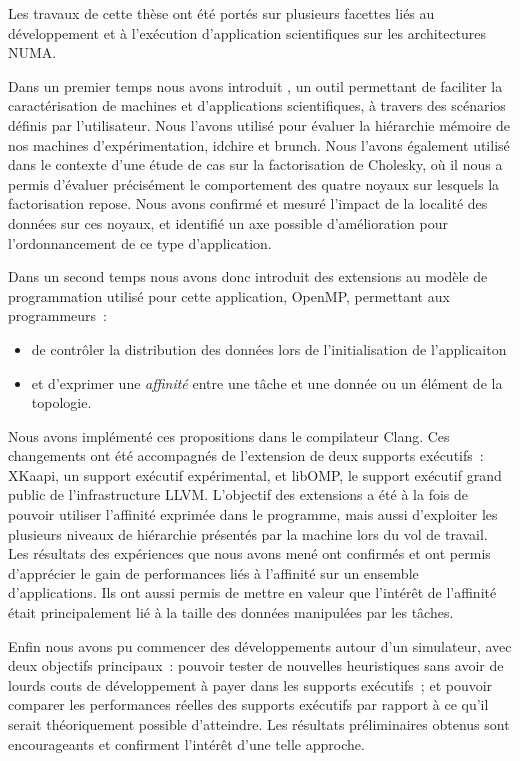 Les travaux de cette thèse ont été portés sur plusieurs facettes liés au développement et à l'exécution d'application scientifiques sur les architectures NUMA.

Dans un premier temps nous avons introduit \outil, un outil permettant de faciliter la caractérisation de machines et d'applications scientifiques, à travers des scénarios définis par l'utilisateur.
Nous l'avons utilisé pour évaluer la hiérarchie mémoire de nos machines d'expérimentation, idchire et brunch.
Nous l'avons également utilisé dans le contexte d'une étude de cas sur la factorisation de Cholesky, où il nous a permis d'évaluer précisément le comportement des quatre noyaux sur lesquels la factorisation repose.
Nous avons confirmé et mesuré l'impact de la localité des données sur ces noyaux, et identifié un axe possible d'amélioration pour l'ordonnancement de ce type d'application.

Dans un second temps nous avons donc introduit des extensions au modèle de programmation utilisé pour cette application, OpenMP, permettant aux programmeurs~:
\begin{itemize}
  \item de contrôler la distribution des données lors de l'initialisation de l'applicaiton
  \item et d'exprimer une \emph{affinité} entre une tâche et une donnée ou un élément de la topologie.
\end{itemize}

Nous avons implémenté ces propositions dans le compilateur Clang.
Ces changements ont été accompagnés de l'extension de deux supports exécutifs~: XKaapi, un support exécutif expérimental, et libOMP, le support exécutif grand public de l'infrastructure LLVM.
L'objectif des extensions a été à la fois de pouvoir utiliser l'affinité exprimée dans le programme, mais aussi d'exploiter les plusieurs niveaux de hiérarchie présentés par la machine lors du vol de travail.
Les résultats des expériences que nous avons mené ont confirmés et ont permis d'apprécier le gain de performances liés à l'affinité sur un ensemble d'applications.
Ils ont aussi permis de mettre en valeur que l'intérêt de l'affinité était principalement lié à la taille des données manipulées par les tâches.

Enfin nous avons pu commencer des développements autour d'un simulateur, avec deux objectifs principaux~: pouvoir tester de nouvelles heuristiques sans avoir de lourds couts de développement à payer dans les supports exécutifs~; et pouvoir comparer les performances réelles des supports exécutifs par rapport à ce qu'il serait théoriquement possible d'atteindre.
Les résultats préliminaires obtenus sont encourageants et confirment l'intérêt d'une telle approche.


